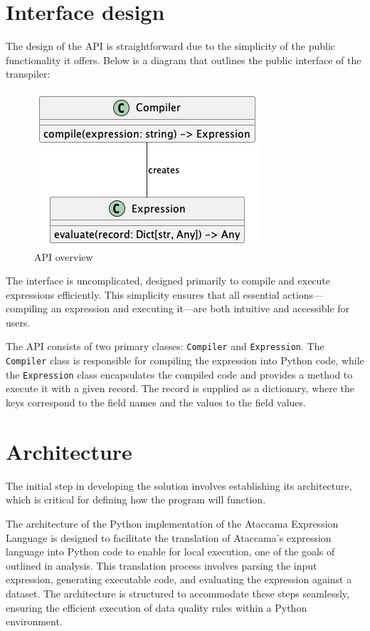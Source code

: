 \section{Interface design}

The design of the API is straightforward due to the simplicity of the public functionality it offers. Below is a diagram that outlines the public interface of the transpiler:

\begin{figure}[htbp]
    \centering
    \includegraphics[scale=0.7]{diagrams/api_design-class.png}
    \caption{API overview}
    \label{fig:api}
\end{figure}

The interface is uncomplicated, designed primarily to compile and execute expressions efficiently. This simplicity ensures that all essential actions—compiling an expression and executing it—are both intuitive and accessible for users.

The API consists of two primary classes: \texttt{Compiler} and \texttt{Expression}. The \texttt{Compiler} class is responsible for compiling the expression into Python code, while the \texttt{Expression} class encapsulates the compiled code and provides a method to execute it with a given record. The record is supplied as a dictionary, where the keys correspond to the field names and the values to the field values.

\section{Architecture}

The initial step in developing the solution involves establishing its architecture, which is critical for defining how the program will function. 

The architecture of the Python implementation of the Ataccama Expression Language is designed to facilitate the translation of Ataccama's expression language into Python code to enable for local execution, one of the goals of outlined in analysis. This translation process involves parsing the input expression, generating executable code, and evaluating the expression against a dataset. The architecture is structured to accommodate these steps seamlessly, ensuring the efficient execution of data quality rules within a Python environment.

